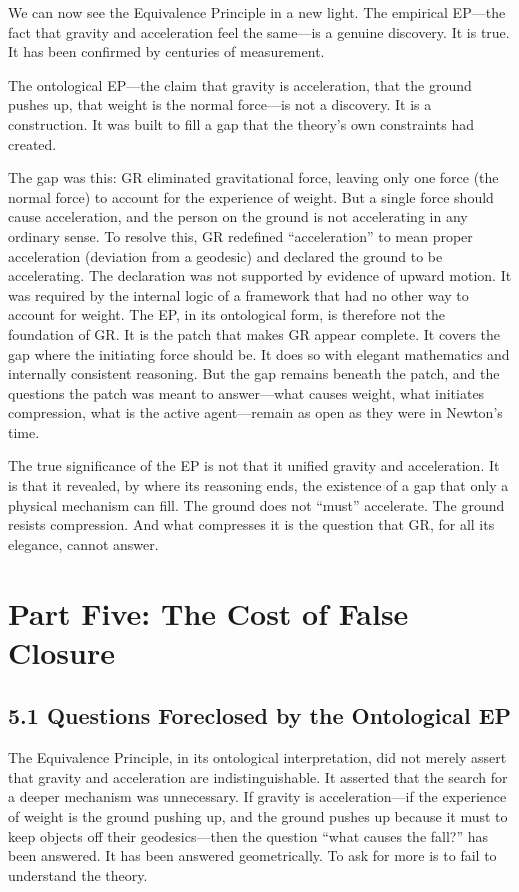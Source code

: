 \documentclass[11pt]{article}
\begin{document}
We can now see the Equivalence Principle in a new light. The empirical EP---the fact that gravity and acceleration feel the same---is a genuine discovery. It is true. It has been confirmed by centuries of measurement.

The ontological EP---the claim that gravity is acceleration, that the ground pushes up, that weight is the normal force---is not a discovery. It is a construction. It was built to fill a gap that the theory's own constraints had created.

The gap was this: GR eliminated gravitational force, leaving only one force (the normal force) to account for the experience of weight. But a single force should cause acceleration, and the person on the ground is not accelerating in any ordinary sense. To resolve this, GR redefined ``acceleration'' to mean proper acceleration (deviation from a geodesic) and declared the ground to be accelerating. The declaration was not supported by evidence of upward motion. It was required by the internal logic of a framework that had no other way to account for weight. The EP, in its ontological form, is therefore not the foundation of GR. It is the patch that makes GR appear complete. It covers the gap where the initiating force should be. It does so with elegant mathematics and internally consistent reasoning. But the gap remains beneath the patch, and the questions the patch was meant to answer---what causes weight, what initiates compression, what is the active agent---remain as open as they were in Newton's time.

The true significance of the EP is not that it unified gravity and acceleration. It is that it revealed, by where its reasoning ends, the existence of a gap that only a physical mechanism can fill. The ground does not ``must'' accelerate. The ground resists compression. And what compresses it is the question that GR, for all its elegance, cannot answer.

\section{Part Five: The Cost of False Closure}

\subsection{5.1 Questions Foreclosed by the Ontological EP}

The Equivalence Principle, in its ontological interpretation, did not merely assert that gravity and acceleration are indistinguishable. It asserted that the search for a deeper mechanism was unnecessary. If gravity is acceleration---if the experience of weight is the ground pushing up, and the ground pushes up because it must to keep objects off their geodesics---then the question ``what causes the fall?'' has been answered. It has been answered geometrically. To ask for more is to fail to understand the theory.
\end{document}

